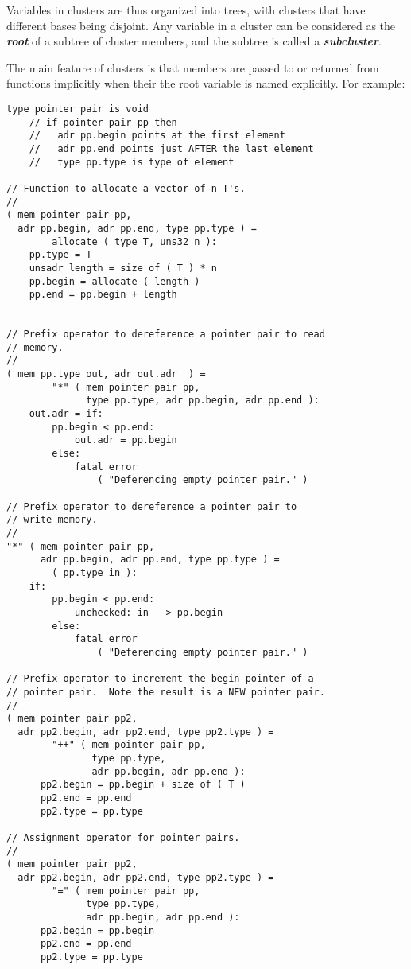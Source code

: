 \documentclass[12pt]{article}
\newcommand{\key}[1]{{\bf \em #1}\index{#1}}
\newcommand{\mkey}[2]{{\bf \em #1}\index{#1!#2}}
\newenvironment{indpar}[1][0.3in]%
	{\begin{list}{}%
		     {\setlength{\itemsep}{0in}%
		      \setlength{\topsep}{0in}%
		      \setlength{\parsep}{1ex}%
		      \setlength{\labelwidth}{#1}%
		      \setlength{\leftmargin}{#1}%
		      \addtolength{\leftmargin}{\labelsep}}%
	 \item}%
	{\end{list}}
\begin{document}
Variables in clusters are thus organized into trees, with clusters
that have different bases being disjoint.  Any variable in a cluster
can be considered
as the \mkey{root}{of subcluster} of a subtree of cluster members, and
the subtree is called a \key{subcluster}.

The main feature of clusters is that members are passed to or returned
from functions implicitly when their the root variable is named
explicitly.  For example:
\begin{indpar}\begin{verbatim}
type pointer pair is void
    // if pointer pair pp then
    //   adr pp.begin points at the first element
    //   adr pp.end points just AFTER the last element
    //   type pp.type is type of element

// Function to allocate a vector of n T's.
//
( mem pointer pair pp,
  adr pp.begin, adr pp.end, type pp.type ) =
        allocate ( type T, uns32 n ):
    pp.type = T
    unsadr length = size of ( T ) * n
    pp.begin = allocate ( length )
    pp.end = pp.begin + length


// Prefix operator to dereference a pointer pair to read
// memory.
//
( mem pp.type out, adr out.adr  ) =
        "*" ( mem pointer pair pp,
              type pp.type, adr pp.begin, adr pp.end ):
    out.adr = if:
        pp.begin < pp.end:
            out.adr = pp.begin
        else:
            fatal error
                ( "Deferencing empty pointer pair." )

// Prefix operator to dereference a pointer pair to
// write memory.
//
"*" ( mem pointer pair pp,
      adr pp.begin, adr pp.end, type pp.type ) =
        ( pp.type in ):
    if:
        pp.begin < pp.end:
            unchecked: in --> pp.begin
        else:
            fatal error
                ( "Deferencing empty pointer pair." )

// Prefix operator to increment the begin pointer of a
// pointer pair.  Note the result is a NEW pointer pair.
//
( mem pointer pair pp2,
  adr pp2.begin, adr pp2.end, type pp2.type ) =
        "++" ( mem pointer pair pp,
               type pp.type,
               adr pp.begin, adr pp.end ):
      pp2.begin = pp.begin + size of ( T )
      pp2.end = pp.end
      pp2.type = pp.type

// Assignment operator for pointer pairs.
//
( mem pointer pair pp2,
  adr pp2.begin, adr pp2.end, type pp2.type ) =
        "=" ( mem pointer pair pp,
              type pp.type,
              adr pp.begin, adr pp.end ):
      pp2.begin = pp.begin
      pp2.end = pp.end
      pp2.type = pp.type


\end{verbatim}
\end{indpar}
\end{document}
